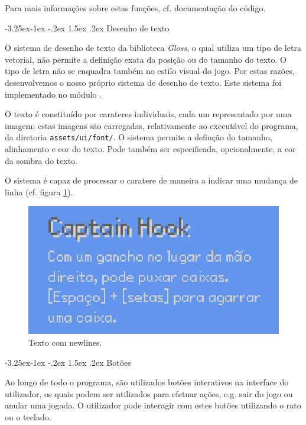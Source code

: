\documentclass[a4paper]{article}
\makeatletter
\renewcommand\paragraph{\@startsection{paragraph}{4}{\z@}%
	{-3.25ex\@plus -1ex \@minus -.2ex}%
	{1.5ex \@plus .2ex}%
	{\normalfont\normalsize\bfseries}}
\makeatother
\begin{document}
Para mais informações sobre estas funções, cf. documentação do código.

\paragraph{Desenho de texto}

O sistema de desenho de texto da biblioteca \emph{Gloss}, o qual utiliza um tipo de letra vetorial, não permite a definição exata da posição ou do tamanho do texto. O tipo de letra não se enquadra também no estilo visual do jogo. Por estas razões, desenvolvemos o nosso próprio sistema de desenho de texto. Este sistema foi implementado no módulo .

O texto é constituído por carateres individuais, cada um representado por uma imagem; estas imagens são carregadas, relativamente ao executável do programa, da diretoria \texttt{assets/ui/font/}. O sistema permite a definção do tamanho, alinhamento e cor do texto. Pode também ser especificada, opcionalmente, a cor da sombra do texto.

O sistema é capaz de processar o caratere  de maneira a indicar uma mudança de linha (cf. figura \ref{fig:text}).

\begin{figure}[ht]
	\centering
	\includegraphics[height=0.15\textheight]{images/text.png}
	\caption{Texto com newlines.}
	\label{fig:text}
\end{figure}

\paragraph{Botões}

Ao longo de todo o programa, são utilizados botões interativos na interface do utilizador, os quais podem ser utilizados para efetuar ações, e.g. sair do jogo ou anular uma jogada. O utilizador pode interagir com estes botões utilizando o rato ou o teclado.
\end{document}

